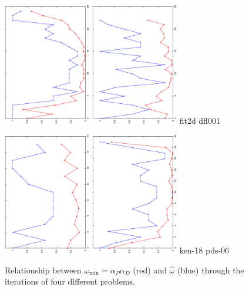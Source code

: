 \begin{figure}[ht]
  \centering
  \hfill
  \includegraphics[width=0.34\textwidth,angle=-90]{figures/fit2d.eps}
  \hfill
  \includegraphics[width=0.34\textwidth,angle=-90]{figures/dfl001.eps}
  fit2d \hspace{15em} dfl001

  \vspace{-2ex}
  \hfill
  \includegraphics[width=0.34\textwidth,angle=-90]{figures/ken-18.eps}
  \hfill
  \includegraphics[width=0.34\textwidth,angle=-90]{figures/pds-06.eps}
  ken-18 \hspace{15em} pds-06
\caption{Relationship between $\omega_{\min}=\alpha_P\alpha_D$ (red)
and $\hat\omega$ (blue) through the iterations of four different problems.}
\label{fig:alpha2omega}
\end{figure}

